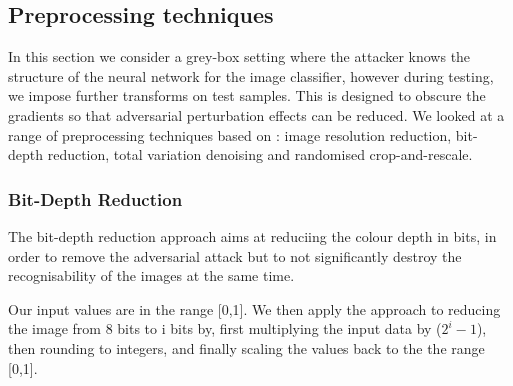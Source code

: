 \subsection{Preprocessing techniques}

In this section we consider a grey-box setting where the attacker knows the structure of the neural network for the image classifier, however during testing, we impose further transforms on test samples. This is designed to obscure the gradients so that adversarial perturbation effects can be reduced. We looked at a range of preprocessing techniques based on \cite{Guo18}: image resolution reduction, bit-depth reduction, total variation denoising and randomised crop-and-rescale.


\subsubsection{Bit-Depth Reduction} %
The bit-depth reduction approach \cite{DBLP:journals/corr/XuEQ17} aims at reduciing the colour depth in bits, in order to remove the adversarial attack but to not significantly destroy the recognisability of the images at the same time. 

Our input values are in the range [0,1]. We then apply the approach to reducing the image from 8 bits to i bits by, first multiplying the input data by ($2^i - 1$), then rounding to integers, and finally scaling the values back to the the range [0,1].

